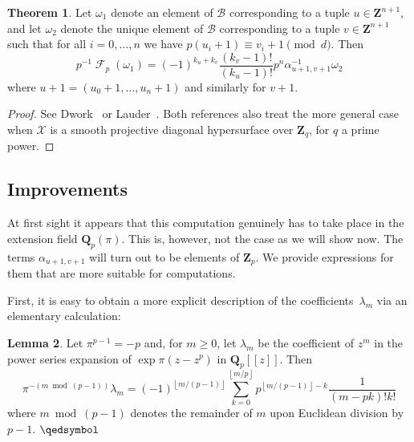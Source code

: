\documentclass[a4paper,11pt]{article}
\numberwithin{equation}{section}
\providecommand{\floor}[1]{\left\lfloor#1\right\rfloor}   %
\newcommand{\ZZ}{\mathbf{Z}} %
\newcommand{\QQ}{\mathbf{Q}} %
\DeclareMathOperator{\Frob}{\mathcal{F}} %
\providecommand{\cB}{\mathcal{B}} %
\theoremstyle{definition}
\newtheorem{thm}{Theorem}[section]
\newtheorem{lem}[thm]{Lemma}
\begin{document}
\begin{thm} \label{thm:01-03-diagfrob}
Let $\omega_1$ denote an element of $\cB$ corresponding to a tuple $u \in \ZZ^{n+1}$,
and let $\omega_2$ denote the unique element of $\cB$ corresponding to 
a tuple $v \in \ZZ^{n+1}$ such that for all $i = 0, \dotsc, n$ we have 
$p (u_i + 1) \equiv v_i + 1 \pmod{d}$. Then
\begin{equation}
p^{-1} \Frob_p (\omega_1) = 
    (-1)^{k_u + k_v} \frac{(k_v - 1)!}{(k_u - 1)!} p^n \alpha_{u+1,v+1}^{-1} \omega_2
\end{equation}
where $u + 1 = (u_0 + 1, \dotsc, u_n + 1)$ and similarly for $v + 1$.
\end{thm}

\begin{proof}
See Dwork~\citep[\S 4]{Dwork1964} or 
Lauder~\citep[\S 6.1]{Lauder2004b}.  Both references also treat the 
more general case when $\mathcal{X}$ is a smooth projective 
diagonal hypersurface over $\ZZ_q$, for $q$ a prime power.
\end{proof}

\subsection{Improvements}

At first sight it appears that this computation genuinely has to take place in 
the extension field $\QQ_p(\pi)$.  This is, however, not the case 
as we will show now.  The terms $\alpha_{u+1,v+1}$ will turn out to be elements 
of $\ZZ_p$. We provide expressions for them that are more suitable
for computations.

First, it is easy to obtain a more explicit description of the 
coefficients~$\lambda_m$ via an elementary calculation:

\begin{lem} \label{lem:lambdam}
Let $\pi^{p-1} = -p$ and, for $m \geq 0$, let $\lambda_m$ 
be the coefficient of $z^m$ in the power series expansion 
of $\exp \pi (z - z^p)$ in $\QQ_p[[z]]$.  Then 
\begin{equation}
\pi^{- (m \bmod{(p-1)})} \lambda_m = (-1)^{\floor{m/(p-1)}} \sum_{k=0}^{\floor{m/p}} p^{\floor{m/(p-1)} - k} \frac{1}{(m-pk)! k!}
\end{equation}
where $m \bmod{(p-1)}$ denotes the remainder of $m$ upon Euclidean 
division by $p-1$. \hfill $\qedsymbol$
\end{lem}
\end{document}
